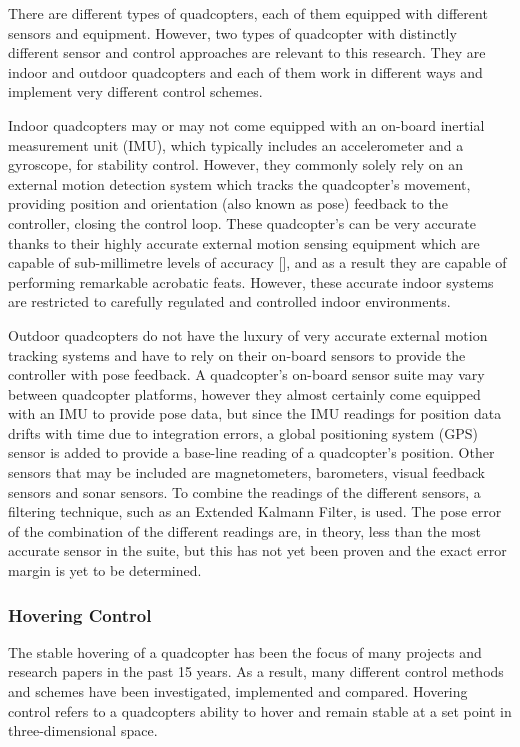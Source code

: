 There are different types of quadcopters, each of them equipped with different sensors and equipment. However, two types of quadcopter with distinctly different sensor and control approaches are relevant to this research. They are indoor and outdoor quadcopters and each of them work in different ways and implement very different control schemes. 

Indoor quadcopters may or may not come equipped with an on-board inertial measurement unit (IMU), which typically includes an accelerometer and a gyroscope, for stability control. However, they commonly solely rely on an external motion detection system which tracks the quadcopter's movement, providing position and orientation (also known as pose) feedback to the controller, closing the control loop. These quadcopter's can be very accurate thanks to their highly accurate external motion sensing equipment which are capable of sub-millimetre levels of accuracy [\cite{richards1999measurement}], and as a result they are capable of performing remarkable acrobatic feats. However, these accurate indoor systems are restricted to carefully regulated and controlled indoor environments.

Outdoor quadcopters do not have the luxury of very accurate external motion tracking systems and have to rely on their on-board sensors to provide the controller with pose feedback. A quadcopter's on-board sensor suite may vary between quadcopter platforms, however they almost certainly come equipped with an IMU to provide pose data, but since the IMU readings for position data drifts with time due to integration errors, a global positioning system (GPS) sensor is added to provide a base-line reading of a quadcopter's position. Other sensors that may be included are magnetometers, barometers, visual feedback sensors and sonar sensors. To combine the readings of the different sensors, a filtering technique, such as an Extended Kalmann Filter, is used. The pose error of the combination of the different readings are, in theory, less than the most accurate sensor in the suite, but this has not yet been proven and the exact error margin is yet to be determined. 

\subsubsection{Hovering Control}

The stable hovering of a quadcopter has been the focus of many projects and research papers in the past 15 years. As a result, many different control methods and schemes have been investigated, implemented and compared. Hovering control refers to a quadcopters ability to hover and remain stable at a set point in three-dimensional space.

